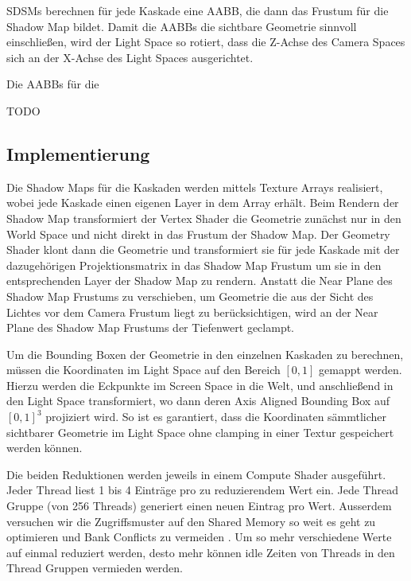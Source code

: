 \documentclass[runningheaders,a4paper]{llncs}
\begin{document}
SDSMs berechnen für jede Kaskade eine AABB, die dann das Frustum für die Shadow Map bildet.
Damit die AABBs die sichtbare Geometrie sinnvoll einschließen, wird der Light Space so rotiert, dass die Z-Achse des Camera Spaces sich an der X-Achse des Light Spaces ausgerichtet.

Die AABBs für die 

TODO


\subsection{Implementierung}

Die Shadow Maps für die Kaskaden werden mittels Texture Arrays realisiert, wobei jede Kaskade einen eigenen Layer in dem Array erhält.
Beim Rendern der Shadow Map transformiert der Vertex Shader die Geometrie zunächst nur in den World Space und nicht direkt in das Frustum der Shadow Map.
Der Geometry Shader klont dann die Geometrie und transformiert sie für jede Kaskade mit der dazugehörigen Projektionsmatrix in das Shadow Map Frustum um sie in den entsprechenden Layer der Shadow Map zu rendern.
Anstatt die Near Plane des Shadow Map Frustums zu verschieben, um Geometrie die aus der Sicht des Lichtes vor dem Camera Frustum liegt zu berücksichtigen, wird an der Near Plane des Shadow Map Frustums der Tiefenwert geclampt.

Um die Bounding Boxen der Geometrie in den einzelnen Kaskaden zu berechnen, müssen die Koordinaten im Light Space auf den Bereich $[0, 1]$ gemappt werden.
Hierzu werden die Eckpunkte im Screen Space in die Welt, und anschließend in den Light Space transformiert, wo dann deren Axis Aligned Bounding Box auf $[0, 1]^3$ projiziert wird.
So ist es garantiert, dass die Koordinaten sämmtlicher sichtbarer Geometrie im Light Space ohne clamping in einer Textur gespeichert werden können.

Die beiden Reduktionen werden jeweils in einem Compute Shader ausgeführt.
Jeder Thread liest 1 bis 4 Einträge pro zu reduzierendem Wert ein.
Jede Thread Gruppe (von 256 Threads) generiert einen neuen Eintrag pro Wert.
Ausserdem versuchen wir die Zugriffsmuster auf den Shared Memory so weit es geht zu optimieren und Bank Conflicts zu vermeiden \cite{reduction}.
Um so mehr verschiedene Werte auf einmal reduziert werden, desto mehr können idle Zeiten von Threads in den Thread Gruppen vermieden werden.
\end{document}
